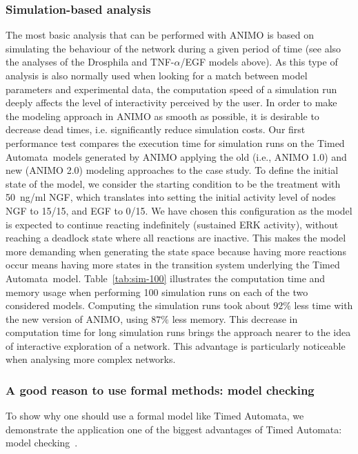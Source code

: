 \documentclass{bmcart}
\def\tas{Timed Automata}
\begin{document}
\subsubsection*{Simulation-based analysis}
The most basic analysis that can be performed with ANIMO is based on simulating the behaviour
of the network during a given period of time (see also the analyses
of the Drosphila and TNF-$\alpha$/EGF models above). As this type of analysis is also normally
used when looking for a match between model parameters and experimental data, the computation
speed of a simulation run deeply affects the level of interactivity perceived by the user.
In order to make
the modeling approach in ANIMO as smooth as possible, it is desirable to decrease dead times,
i.e. significantly reduce simulation costs.
Our first performance test compares the execution time for simulation runs on the \tas\ models
generated by ANIMO applying the old (i.e., ANIMO 1.0) and new (ANIMO 2.0) modeling approaches to the case study.
To define the initial state of the model, we consider the starting condition to be the treatment with 50~ng/ml NGF, which translates into
setting the initial activity level of nodes NGF to 15/15, and EGF to 0/15. We have chosen this configuration as the
model is expected to continue reacting indefinitely (sustained ERK activity), without reaching a deadlock state where all reactions are inactive.
This makes the model more demanding when generating the state space
because having more reactions occur means having more states in the transition system underlying the \tas\ model.
Table~\ref{tab:sim-100} illustrates the computation time and memory usage when performing 100 simulation runs on each of the
two considered models. Computing the simulation runs took about $92 \%$ less time with the new version of ANIMO, using $87 \%$
less memory. This decrease in computation time for long simulation runs brings the approach nearer to the idea
of interactive exploration of a network. This advantage is particularly noticeable when analysing
more complex networks.


\subsubsection*{A good reason to use formal methods: model checking}
To show why one should use a formal model like \tas, we demonstrate the application
one of the biggest advantages of \tas: model checking~\cite{model-checking}.
\end{document}
